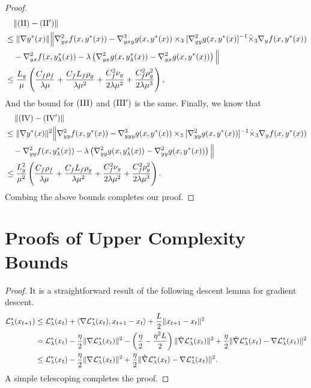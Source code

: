 \begin{proof}
{ \begin{align*}
    &\quad \lVert{\rm (II)} - {\rm (II')}\rVert \\
    &\le 
      \Vert \nabla y^*(x) \Vert \Big \Vert  \nabla_{yx}^2 f(x,y^*(x)) - \nabla_{yxy}^3 g(x,y^*(x)) \times_3 [\nabla_{yy}^2 g(x,y^*(x)]^{-1} \bar \times_3 \nabla_y f(x,y^*(x))\\
     &\quad - \nabla_{yx}^2 f(x,y_{\lambda}^*(x))-\lambda  \left(\nabla_{yx}^2 g(x,y_{\lambda}^*(x))-\nabla_{yx}^2 g(x,y^*(x)) \right) \Big \Vert \\
     & \le \frac{L_g }{\mu} \left( \frac{C_f \rho_f}{\lambda \mu} + \frac{C_f L_f \rho_g}{\lambda \mu^2}  + \frac{C_f^2 \nu_g}{2\lambda \mu^2} +\frac{C_f^2 \rho_g^2}{2 \lambda \mu^3} \right),
\end{align*}}
And the bound for ${\rm(III)}$ and $ {\rm (III')}$ is the same. Finally, we know that
\begin{align*}
    &\quad \left \Vert {\rm (IV)} - {\rm (IV')} \right \Vert \\
    &\le \Vert \nabla y^*(x) \Vert^2 \Big \Vert \nabla_{yy}^2 f(x,y^*(x)) - \nabla_{yyy}^3 g(x,y^*(x)) \times_3 [ \nabla_{yy}^2 g(x,y^*(x))]^{-1} \bar \times_3 \nabla_y f(x,y^*(x))  \\
    &\quad - \nabla_{yy}^2 f(x,y_{\lambda}^*(x)) - \lambda \left( \nabla_{yy}^2 g(x,y_{\lambda}^*(x)) - \nabla_{yy}^2 g(x,y^*(x)) \right) \Big \Vert \\
    &\le \frac{L_g^2}{\mu^2} \left( \frac{C_f \rho_f}{\lambda \mu} + \frac{C_f L_f \rho_g}{\lambda \mu^2}  + \frac{C_f^2 \nu_g}{2\lambda \mu^2} +  \frac{C_f^2 \rho_g^2}{2 \lambda \mu^3}\right).
\end{align*}
Combing the above bounds completes our proof.
\end{proof}

\section{Proofs of Upper Complexity Bounds} \label{apx:pf-alg}

\propGD*

\begin{proof}
It is a straightforward result of the following descent lemma for gradient descent.
\begin{align*}
    {\mathcal{L}}_{\lambda}^*(x_{t+1}) &\le {\mathcal{L}}_{\lambda}^*(x_t) + \langle \nabla {\mathcal{L}}_{\lambda}^*(x_t) , x_{t+1} - x_t
    \rangle + \frac{L}{2} \Vert x_{t+1 } - x_t \Vert^2 \\
    &= {\mathcal{L}}_{\lambda}^*(x_t) -
    \frac{\eta}{2} \Vert \nabla {\mathcal{L}}_{\lambda}^*(x_t) \Vert^2 -
    \left( \frac{\eta}{2} - \frac{\eta^2 L}{2} \right) \Vert \hat \nabla {\mathcal{L}}_{\lambda}^*(x_t) \Vert^2 + \frac{\eta}{2} \Vert \hat  \nabla {\mathcal{L}}_{\lambda}^*(x_t) - \nabla {\mathcal{L}}_{\lambda}^*(x_t) \Vert^2 \\
    &\le {\mathcal{L}}_{\lambda}^*(x_t) 
    - \frac{\eta}{2} \Vert \nabla {\mathcal{L}}_{\lambda}^*(x_t) \Vert^2 
    + \frac{\eta}{2} \Vert  \hat \nabla {\mathcal{L}}_{\lambda}^*(x_t) - \nabla {\mathcal{L}}_{\lambda}^*(x_t) \Vert^2.
\end{align*}
A simple telescoping completes the proof.
\end{proof}

